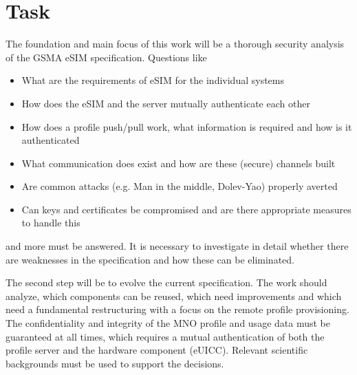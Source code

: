 
\chapter{Task}\label{chapter:task}
The foundation and main focus of this work will be a thorough security analysis of the GSMA eSIM specification. Questions like
\begin{itemize}
    \item What are the requirements of eSIM for the individual systems
    \item How does the eSIM and the server mutually authenticate each other
    \item How does a profile push/pull work, what information is required and how is it authenticated
    \item What communication does exist and how are these (secure) channels built
    \item Are common attacks (e.g. Man in the middle, Dolev-Yao) properly averted
    \item Can keys and certificates be compromised and are there appropriate measures to handle this
\end{itemize}
and more must be answered. It is necessary to investigate in detail whether there are weaknesses in the specification and how these can be eliminated.

The second step will be to evolve the current specification. The work should analyze, which components can be reused, which need improvements and which need a fundamental restructuring with a focus on the remote profile provisioning. The confidentiality and integrity of the MNO profile and usage data must be guaranteed at all times, which requires a mutual authentication of both the profile server and the hardware component (\acrshort{eUICC}). Relevant scientific backgrounds must be used to support the decisions.

